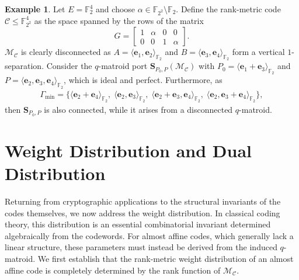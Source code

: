 \documentclass[a4paper,11pt,reqno]{article}
\newcommand{\F}{\mathbb{F}}
\newcommand{\M}{\mathcal{M}}
\newcommand{\C}{\mathcal{C}}
\theoremstyle{plain} \numberwithin{equation}{section}
\theoremstyle{definition}
\newtheorem{example}[theorem]{Example}
\begin{document}
\begin{example}
Let $E= \F_2^4$ and choose $\alpha \in \F_{2^2}\setminus \F_2$. Define the rank-metric code $\C\leq \F_{2^2}^4$ as the space spanned by the rows of the matrix
\[
    G = \begin{bmatrix}
        1 & \alpha & 0 & 0 \\
        0 & 0 & 1 & \alpha
    \end{bmatrix}.
\]
$\M_\C$ is clearly disconnected as $A = \langle \mathbf{e}_1,\mathbf{e}_2\rangle_{\F_2}$ and $B = \langle \mathbf{e}_3,\mathbf{e}_4\rangle_{\F_2}$ form a vertical $1$-separation. Consider the $q$-matroid port $\mathbf{S}_{P_0,P}(\M_\C)$ with $P_0 = \langle \mathbf{e}_1 +\mathbf{e}_3\rangle_{\F_2}$ and $P = \langle \mathbf{e}_2,\mathbf{e}_3,\mathbf{e}_4\rangle_{\F_2}$, which is ideal and perfect. Furthermore, as
\begin{align*}
    \Gamma_{\min} = \{\langle \mathbf{e}_2+\mathbf{e}_4\rangle_{\F_2},\; \langle \mathbf{e}_2,\mathbf{e}_3\rangle_{\F_2},\; \langle \mathbf{e}_2+\mathbf{e}_3,\mathbf{e}_4\rangle_{\F_2},\; \langle \mathbf{e}_2,\mathbf{e}_3+\mathbf{e}_4\rangle_{\F_2} \},
\end{align*}
then $\mathbf{S}_{P_0,P}$ is also connected, while it arises from a disconnected $q$-matroid.
\end{example}

\section{Weight Distribution and Dual Distribution} \label{sec:weight}
Returning from cryptographic applications to the structural invariants of the codes themselves, we now address the weight distribution. In classical coding theory, this distribution is an essential combinatorial invariant determined algebraically from the codewords. For almost affine codes, which generally lack a linear structure, these parameters must instead be derived from the induced $q$-matroid. We first establish that the rank-metric weight distribution of an almost affine code is completely determined by the rank function of $\mathcal{M}_{\mathcal{C}}$.
\end{document}
